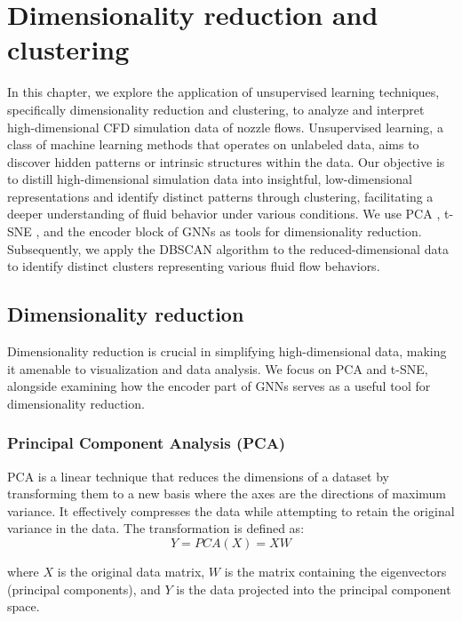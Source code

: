 \chapter{Dimensionality reduction and clustering}
\label{chap:cluster}
In this chapter, we explore the application of unsupervised learning techniques, specifically dimensionality reduction and clustering, to analyze and interpret high-dimensional CFD simulation data of nozzle flows. Unsupervised learning, a class of machine learning methods that operates on unlabeled data, aims to discover hidden patterns or intrinsic structures within the data. Our objective is to distill high-dimensional simulation data into insightful, low-dimensional representations and identify distinct patterns through clustering, facilitating a deeper understanding of fluid behavior under various conditions. We use \gls{PCA} \cite{pearson1901pca}, \gls{t-SNE} \cite{vandermaaten2008tsne}, and the encoder block of GNNs as tools for dimensionality reduction. Subsequently, we apply the \gls{DBSCAN} algorithm \cite{ester1996dbscan} to the reduced-dimensional data to identify distinct clusters representing various fluid flow behaviors.
\section{Dimensionality reduction}
Dimensionality reduction is crucial in simplifying high-dimensional data, making it amenable to visualization and data analysis. We focus on PCA and t-SNE, alongside examining how the encoder part of GNNs serves as a useful tool for dimensionality reduction.

\subsection{Principal Component Analysis (PCA)}
PCA is a linear technique that reduces the dimensions of a dataset by transforming them to a new basis where the axes are the directions of maximum variance. It effectively compresses the data while attempting to retain the original variance in the data. The transformation is defined as:
\begin{equation}
    Y = PCA(X) = XW
    \end{equation}
    
where $X$ is the original data matrix, $W$ is the matrix containing the eigenvectors (principal components), and $Y$ is the data projected into the principal component space.
